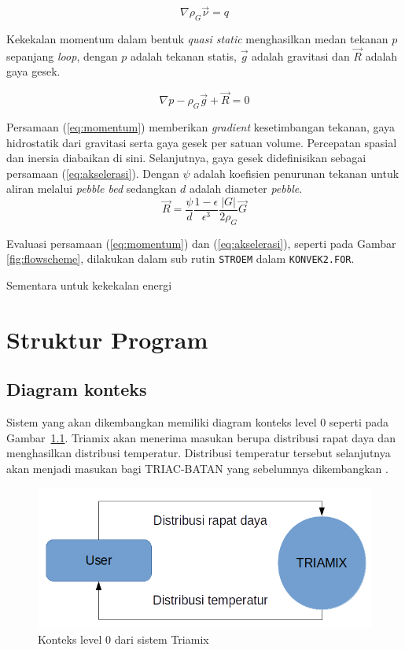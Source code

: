 \documentclass[a4paper,11pt]{report}
\renewcommand{\figurename}{Gambar}
\begin{document}
\begin{equation}
  \nabla \rho_G \vec{\nu}=q
  \label{eq:q}
\end{equation}

Kekekalan momentum dalam bentuk \textit{quasi static} menghasilkan medan tekanan $p$ sepanjang \textit{loop}, dengan $p$ adalah tekanan statis, $\vec{g}$ adalah gravitasi dan $\vec{R}$ adalah gaya gesek. 

\begin{equation}
  \nabla p-\rho_G \vec{g} + \vec{R}=0
  \label{eq:momentum}
\end{equation}

Persamaan (\ref{eq:momentum}) memberikan \textit{gradient} kesetimbangan tekanan, gaya hidrostatik dari gravitasi serta gaya gesek per satuan volume. Percepatan spasial dan inersia diabaikan di sini. Selanjutnya, gaya gesek didefinisikan sebagai persamaan (\ref{eq:akselerasi}). Dengan $\psi$ adalah koefisien penurunan tekanan untuk aliran melalui \textit{pebble bed} sedangkan $d$ adalah diameter \textit{pebble}. 
\begin{equation}
  \vec{R}=\frac{\psi}{d}\frac{1-\epsilon}{\epsilon^3}\frac{|G|}{2\rho_G}\vec{G}
  \label{eq:akselerasi}
\end{equation}

Evaluasi persamaan (\ref{eq:momentum}) dan (\ref{eq:akselerasi}), seperti pada Gambar \ref{fig:flowscheme}, dilakukan dalam sub rutin \texttt{STROEM} dalam \texttt{KONVEK2.FOR}.

Sementara untuk kekekalan energi
\chapter{Struktur Program}

\section{Diagram konteks}
Sistem yang akan dikembangkan memiliki diagram konteks level 0 seperti pada \figurename~\ref{fig:level0}. Triamix akan menerima masukan berupa distribusi rapat daya dan menghasilkan distribusi temperatur. Distribusi temperatur tersebut selanjutnya akan menjadi masukan bagi TRIAC-BATAN yang sebelumnya dikembangkan \cite{triac1}.

\begin{figure}[h!]
  \begin{center}
    \includegraphics[scale=.4]{pics/contextLevel0.png}
    \caption{Konteks level 0 dari sistem Triamix}
    \label{fig:level0}
  \end{center}
\end{figure}
\end{document}
